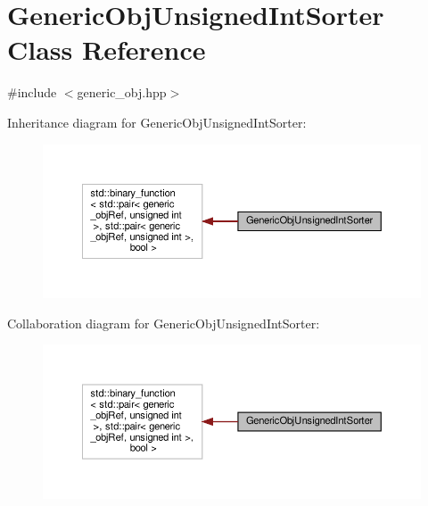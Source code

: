 \hypertarget{classGenericObjUnsignedIntSorter}{}\section{Generic\+Obj\+Unsigned\+Int\+Sorter Class Reference}
\label{classGenericObjUnsignedIntSorter}


{\ttfamily \#include $<$generic\+\_\+obj.\+hpp$>$}



Inheritance diagram for Generic\+Obj\+Unsigned\+Int\+Sorter\+:
\nopagebreak
\begin{figure}[H]
\begin{center}
\leavevmode
\includegraphics[width=350pt]{d8/d3d/classGenericObjUnsignedIntSorter__inherit__graph}
\end{center}
\end{figure}


Collaboration diagram for Generic\+Obj\+Unsigned\+Int\+Sorter\+:
\nopagebreak
\begin{figure}[H]
\begin{center}
\leavevmode
\includegraphics[width=350pt]{d4/d2d/classGenericObjUnsignedIntSorter__coll__graph}
\end{center}
\end{figure}
